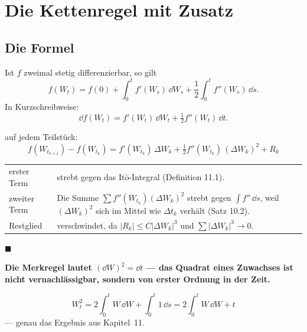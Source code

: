 \chapter{Die Kettenregel mit Zusatz}

\section{Die Formel}

\begin{merksatz}
Ist $f$ zweimal stetig differenzierbar, so gilt
\[ f(W_t) = f(0) + \int_0^t f'(W_s)\,\dd W_s + \frac12\int_0^t f''(W_s)\,\dd s . \]
In Kurzschreibweise:
\[ \dd f(W_t) = f'(W_t)\,\dd W_t + \tfrac12 f''(W_t)\,\dd t . \]

 auf jedem Teilstück:
\[ f(W_{t_{k+1}}) - f(W_{t_k}) = f'(W_{t_k})\,\Delta W_k + \tfrac12 f''(W_{t_k})\,(\Delta W_k)^{2} + R_k \]

\begin{center}
{\small
\renewcommand{\arraystretch}{1.5}
\begin{tabular}{@{}P{2.6cm}P{6.0cm}@{}}
\toprule
erster Term & strebt gegen das Itō-Integral (Definition 11.1).\\
zweiter Term & Die Summe $\sum f''(W_{t_k})(\Delta W_k)^{2}$ strebt gegen $\int f''\,\dd s$, weil $(\Delta W_k)^{2}$ sich im Mittel wie $\Delta t_k$ verhält (Satz 10.2).\\
Restglied & verschwindet, da $|R_k| \le C|\Delta W_k|^{3}$ und $\sum|\Delta W_k|^{3} \to 0$.\\
\bottomrule
\end{tabular}}
\end{center}
$\blacksquare$

\begin{center}
\begin{minipage}{0.9\textwidth}
\textbf{Die Merkregel lautet $(\dd W)^{2} = \dd t$ --- das Quadrat eines Zuwachses ist nicht vernachlässigbar, sondern von erster Ordnung in der Zeit.}
\end{minipage}
\end{center}

\[ W_t^{2} = 2\int_0^t W\,\dd W + \int_0^t 1\,\dd s = 2\int_0^t W\,\dd W + t \]
--- genau das Ergebnis aus Kapitel~11. \checkmark
\end{merksatz}

